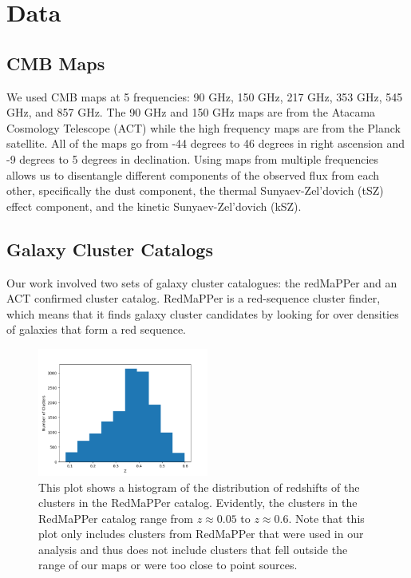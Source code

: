 \documentclass{princeton_astro_thesis}
\begin{document}
\chapter{Data}
\section{CMB Maps}
We used CMB maps at 5 frequencies: 90 GHz, 150 GHz, 217 GHz, 353 GHz, 545 GHz, and 857 GHz. The 90 GHz and 150 GHz maps are from the Atacama Cosmology Telescope (ACT) while the high frequency maps are from the Planck satellite. All of the maps go from -44 degrees to 46 degrees in right ascension and -9 degrees to 5 degrees in declination. Using maps from multiple frequencies allows us to disentangle different components of the observed flux from each other, specifically the dust component, the thermal Sunyaev-Zel'dovich (tSZ) effect component, and the kinetic Sunyaev-Zel'dovich  (kSZ).
\section{Galaxy Cluster Catalogs}
Our work involved two sets of galaxy cluster catalogues: the redMaPPer and an ACT confirmed cluster catalog. RedMaPPer is a red-sequence cluster finder, which means that it finds galaxy cluster candidates by looking for over densities of galaxies that form a red sequence.
\begin{figure}[h]
\centering
\includegraphics[width=0.5\textwidth]{../redmapper_z_hist.png}
\caption{This plot shows a histogram of the distribution of redshifts of the clusters in the RedMaPPer catalog. Evidently, the clusters in the RedMaPPer catalog range from $z\approx0.05$ to $z\approx0.6$. Note that this plot only includes clusters from RedMaPPer that were used in our analysis and thus does not include clusters that fell outside the range of our maps or were too close to point sources. }
\end{figure}
\end{document}
